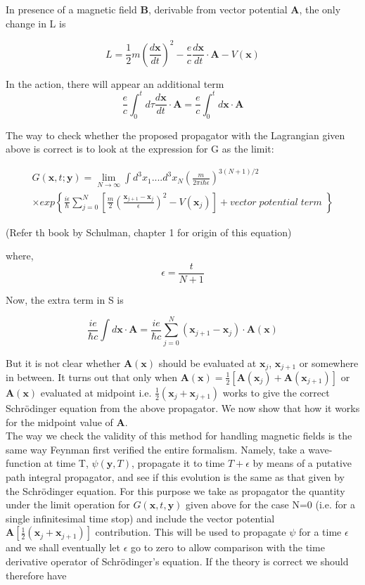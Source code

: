 \documentclass[14pt]{extarticle}
\begin{document}
In presence of a magnetic field $\textbf{B}$, derivable from vector potential $\textbf{A}$, the only change in L is

$$L = \frac{1}{2} m \left( \frac{d\textbf{x}}{dt} \right)^2 - \frac{e}{c} 
\frac{d\textbf{x}}{dt} \cdot \textbf{A}  - V(\textbf{x})$$

In the action, there will appear an additional term
 $$\frac{e}{c} \int_0^t d\tau \frac{d\textbf{x}}{dt} \cdot  \textbf{A}  = \frac{e}{c} \int_0^t d\textbf{x} \cdot \textbf{A}$$

The way to check whether the proposed propagator with the Lagrangian given above is correct is to look at the expression for G as the limit:


\begin{eqnarray}
G(\textbf{x},t;\textbf{y}) = \lim_{N\rightarrow \infty} \int d^3x_1....d^3x_N \left( \frac{m}{2 \pi i \hbar \epsilon} \right)^{3(N+1)/2} \nonumber \\
\times exp \left\lbrace \frac{i\epsilon}{\hbar} \sum_{j=0}^N \left[ \frac{m}{2} \left( \frac{\textbf{x}_{j+1}-\textbf{x}_j}{\epsilon} \right)^2 -V(\textbf{x}_j) \right] + vector\; potential\; term\; \right\rbrace \nonumber
\end{eqnarray}


(Refer th book by Schulman, chapter 1 for origin of this equation)

where,$$\epsilon = \frac{t}{N+1}$$

Now, the extra term in S is

$$\frac{ie}{\hbar c} \int d\textbf{x} \cdot \textbf{A} = \frac{ie}{\hbar c} \sum_{j=0}^N (\textbf{x}_{j+1} - \textbf{x}_j) \cdot \textbf{A}(\textbf{x})$$


But it is not clear whether $\textbf{A}(\textbf{x})$ should be evaluated at $\textbf{x}_j$, $\textbf{x}_{j+1}$ or somewhere in between. It turns out that only when $\textbf{A}(\textbf{x})= \frac{1}{2} [\textbf{A}(\textbf{x}_j) + \textbf{A}(\textbf{x}_{j+1})]$ or $ \textbf{A}(\textbf{x})$ evaluated at midpoint i.e. $\frac{1}{2} (\textbf{x}_j + \textbf{x}_{j+1})$ works to give the correct Schrödinger equation from the above propagator. We now show that how it works for the midpoint value of $\textbf{A}$.\\

The way we check the validity of this method for handling magnetic fields is the same way Feynman first verified the entire formalism. Namely, take a wave-function at time T, $\psi (\textbf{y},T)$, propagate it to time $T+\epsilon$ by means of a putative path integral propagator, and see if this evolution is the same as that given by the Schrödinger equation. For this purpose we take as propagator the quantity under the limit operation for $G(\textbf{x},t,\textbf{y})$ given above for the case N=0 (i.e. for a single infinitesimal time stop) and include the vector potential $\textbf{A}[\frac{1}{2} (\textbf{x}_j + \textbf{x}_{j+1})]$ contribution. This will be used to propagate $\psi$ for a time $\epsilon$ and we shall eventually let $\epsilon$ go to zero to allow comparison with the time derivative operator of Schrödinger’s equation. If the theory is correct we should therefore have
\end{document}

